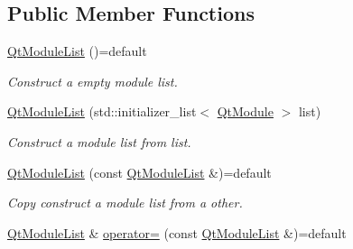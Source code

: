 \subsection*{Public Member Functions}
\begin{DoxyCompactItemize}
\item 
\hyperlink{class_mdt_1_1_deploy_utils_1_1_qt_module_list_ab23ea2c60a6bf96708beb5c383b35436}{Qt\+Module\+List} ()=default\hypertarget{class_mdt_1_1_deploy_utils_1_1_qt_module_list_ab23ea2c60a6bf96708beb5c383b35436}{}\label{class_mdt_1_1_deploy_utils_1_1_qt_module_list_ab23ea2c60a6bf96708beb5c383b35436}

\begin{DoxyCompactList}\small\item\em Construct a empty module list. \end{DoxyCompactList}\item 
\hyperlink{class_mdt_1_1_deploy_utils_1_1_qt_module_list_a891a99d6bb1c71d110f5efaba0996d95}{Qt\+Module\+List} (std\+::initializer\+\_\+list$<$ \hyperlink{namespace_mdt_1_1_deploy_utils_af64a196dd2a56ed4930253e7fb4ed591}{Qt\+Module} $>$ list)\hypertarget{class_mdt_1_1_deploy_utils_1_1_qt_module_list_a891a99d6bb1c71d110f5efaba0996d95}{}\label{class_mdt_1_1_deploy_utils_1_1_qt_module_list_a891a99d6bb1c71d110f5efaba0996d95}

\begin{DoxyCompactList}\small\item\em Construct a module list from {\itshape list}. \end{DoxyCompactList}\item 
\hyperlink{class_mdt_1_1_deploy_utils_1_1_qt_module_list_a56486fa00efe046b3987b4d414af2806}{Qt\+Module\+List} (const \hyperlink{class_mdt_1_1_deploy_utils_1_1_qt_module_list}{Qt\+Module\+List} \&)=default\hypertarget{class_mdt_1_1_deploy_utils_1_1_qt_module_list_a56486fa00efe046b3987b4d414af2806}{}\label{class_mdt_1_1_deploy_utils_1_1_qt_module_list_a56486fa00efe046b3987b4d414af2806}

\begin{DoxyCompactList}\small\item\em Copy construct a module list from a other. \end{DoxyCompactList}\item 
\hyperlink{class_mdt_1_1_deploy_utils_1_1_qt_module_list}{Qt\+Module\+List} \& \hyperlink{class_mdt_1_1_deploy_utils_1_1_qt_module_list_acf58410a8bb13fb81e8aacbddc4ffec6}{operator=} (const \hyperlink{class_mdt_1_1_deploy_utils_1_1_qt_module_list}{Qt\+Module\+List} \&)=default\hypertarget{class_mdt_1_1_deploy_utils_1_1_qt_module_list_acf58410a8bb13fb81e8aacbddc4ffec6}{}\label{class_mdt_1_1_deploy_utils_1_1_qt_module_list_acf58410a8bb13fb81e8aacbddc4ffec6}


\end{DoxyCompactItemize}
